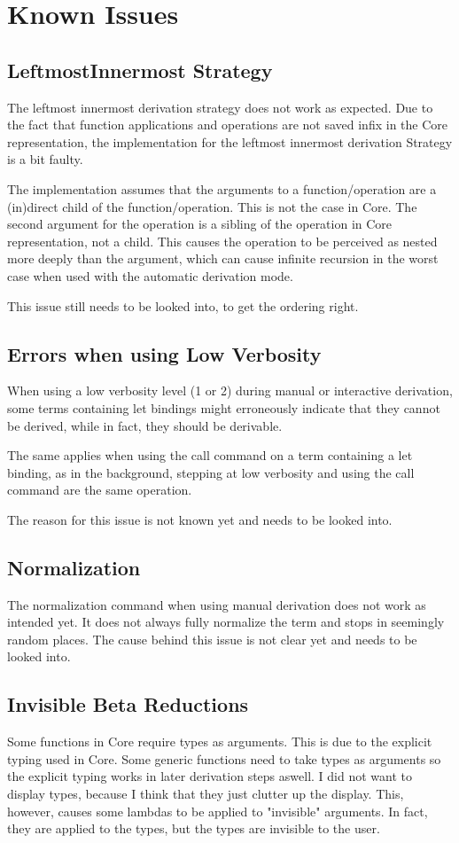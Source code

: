 \section{Known Issues}

\subsection{LeftmostInnermost Strategy}
The leftmost innermost derivation strategy does not work as expected.
Due to the fact that function applications and operations are not saved infix in the Core representation,
the implementation for the leftmost innermost derivation Strategy is a bit faulty.

The implementation assumes that the arguments to a function/operation are a (in)direct child of the function/operation.
This is not the case in Core.
The second argument for the operation is a sibling of the operation in Core representation, not a child.
This causes the operation to be perceived as nested more deeply than the argument,
which can cause infinite recursion in the worst case when used with the automatic derivation mode.

This issue still needs to be looked into,
to get the ordering right.

\subsection{Errors when using Low Verbosity}
When using a low verbosity level (1 or 2) during manual or interactive derivation,
some terms containing let bindings might erroneously indicate that they cannot be derived, 
while in fact,
they should be derivable.

The same applies when using the call command on a term containing a let binding,
as in the background,
stepping at low verbosity and using the call command are the same operation.

The reason for this issue is not known yet and needs to be looked into.


\subsection{Normalization}
The normalization command when using manual derivation does not work as intended yet.
It does not always fully normalize the term and stops in seemingly random places.
The cause behind this issue is not clear yet and needs to be looked into.

\subsection{Invisible Beta Reductions}
Some functions in Core require types as arguments.
This is due to the explicit typing used in Core.
Some generic functions need to take types as arguments so the explicit typing works in later derivation steps aswell.
I did not want to display types,
because I think that they just clutter up the display.
This, however,
causes some lambdas to be applied to "invisible" arguments.
In fact,
they are applied to the types,
but the types are invisible to the user.

